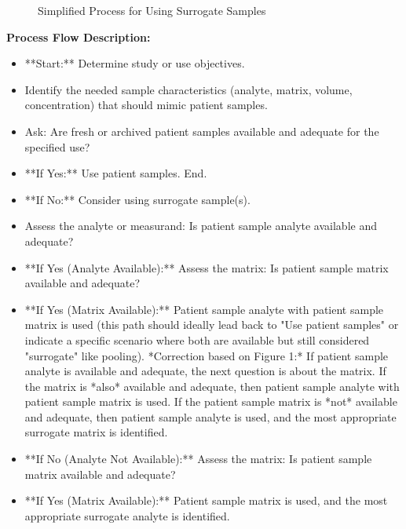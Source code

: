 \documentclass{article}
\begin{document}
\begin{figure}[h!]
    \centering
    \caption{Simplified Process for Using Surrogate Samples \cite{CLSIEP39Ed1E}}
\end{figure}

\textbf{Process Flow Description:}
\begin{itemize}
    \item **Start:** Determine study or use objectives.
    \item Identify the needed sample characteristics (analyte, matrix, volume, concentration) that should mimic patient samples.
    \item Ask: Are fresh or archived patient samples available and adequate for the specified use?
    \item **If Yes:** Use patient samples. End.
    \item **If No:** Consider using surrogate sample(s).
    \item Assess the analyte or measurand: Is patient sample analyte available and adequate?
    \item **If Yes (Analyte Available):** Assess the matrix: Is patient sample matrix available and adequate?
    \item **If Yes (Matrix Available):** Patient sample analyte with patient sample matrix is used (this path should ideally lead back to "Use patient samples" or indicate a specific scenario where both are available but still considered "surrogate" like pooling). *Correction based on Figure 1:* If patient sample analyte is available and adequate, the next question is about the matrix. If the matrix is *also* available and adequate, then patient sample analyte with patient sample matrix is used. If the patient sample matrix is *not* available and adequate, then patient sample analyte is used, and the most appropriate surrogate matrix is identified.
    \item **If No (Analyte Not Available):** Assess the matrix: Is patient sample matrix available and adequate?
    \item **If Yes (Matrix Available):** Patient sample matrix is used, and the most appropriate surrogate analyte is identified.

\end{itemize}
\end{document}
